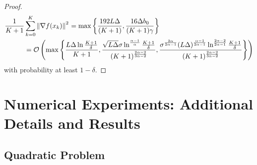 \documentclass{article}
\begin{document}
\begin{proof}
\begin{align*}
        \frac{1}{K+1}&\sum\limits_{k=0}^{K}{\left\lVert\nabla f(x_k)\right\rVert}^2~{\color{black}= \max\left\{\frac{192 L\Delta }{(K+1)}, \frac{16 \Delta b_0}{(K+1)\gamma}\right\}} \\
        &= {\cal O}\left(\max\left\{\frac{L\Delta \ln\frac{K+1}{\delta}}{K+1}, \frac{\sqrt{L\Delta}\sigma \ln^{\frac{\alpha-1}{\alpha}}\frac{K+1}{\delta}}{(K+1)^\frac{2\alpha-2}{3\alpha-2}}, {\color{black}\frac{\sigma^{\frac{2\alpha}{2\alpha-1}}(L\Delta)^\frac{\alpha-1}{2\alpha - 1} \ln^{\frac{2\alpha-2}{2\alpha-1}}\frac{K+1}{\delta}}{(K+1)^\frac{2\alpha-2}{3\alpha-2}}}\right\}\right)
    \end{align*}
with probability at least $1 - \delta$.
\end{proof}


\newpage

\section{Numerical Experiments: Additional Details and Results}\label{appendix:extra_numerical_results}

\subsection{Quadratic Problem}\label{appendix:quadratic}

\end{document}
